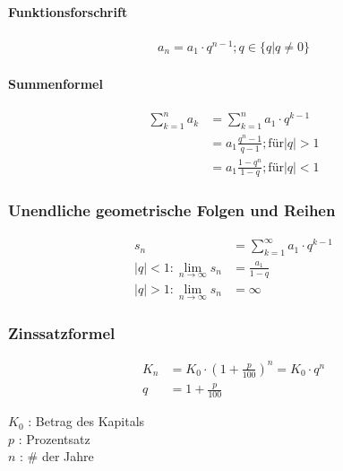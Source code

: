 \paragraph{Funktionsforschrift}
\begin{align*}
    a_n = a_1 \cdot q^{n-1} ; q \in \{q | q \neq 0\}
\end{align*}

\paragraph{Summenformel}
\begin{align*}
    \sum_{k=1}^{n} a_k &= \sum_{k=1}^{n} a_1 \cdot q^{k-1}\\
    &= a_1 \frac{q^n-1}{q-1} ; \textrm{für} |q| > 1\\
    &= a_1 \frac{1-q^n}{1-q} ; \textrm{für} |q| < 1
\end{align*}

\subsubsection{Unendliche geometrische Folgen und Reihen}
\begin{align*}
    s_n &=\sum_{k=1}^{\infty} a_1 \cdot q^{k-1}\\
    |q|<1: \lim_{n \to \infty } s_n &= \frac{a_1}{1-q}\\
    |q|>1: \lim_{n \to \infty } s_n &= \infty
\end{align*}

\subsubsection{Zinssatzformel}
\begin{align*}
    K_n &= K_0 \cdot (1 + \frac{p}{100})^n = K_0 \cdot q^n \\
    q &= 1 + \frac{p}{100}
\end{align*}

$K_0$ : Betrag des Kapitals \\
$p$ : Prozentsatz \\
$n$ : \# der Jahre
